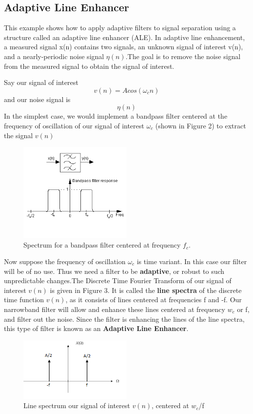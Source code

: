 \subsection{Adaptive Line Enhancer}
This example shows how to apply adaptive filters to signal separation using a structure called an adaptive line enhancer (ALE). In adaptive line enhancement, a measured signal x(n) contains two signals, an unknown signal of interest v(n), and a nearly-periodic noise signal $\eta(n)$.The goal is to remove the noise signal from the measured signal to obtain the signal of interest. 

Say our signal of interest $$v(n)= Acos(\omega_cn)$$ and our noise signal is $$\eta(n)$$In the simplest case, we would implement a bandpass filter centered at the frequency of oscillation of our signal of interest $\omega_c$ (shown in Figure 2) to extract the signal $v(n)$

\begin{figure}[!ht]
\centering
\includegraphics[width=0.5\textwidth]{bandpass_filter.png}
\caption{\label{fig:bandpass_filter}Spectrum for a bandpass filter centered at frequency $f_c$.}
\end{figure}

Now suppose the frequency of oscillation $\omega_c$ is time variant. In this case our filter will be of no use. Thus we need a filter to be \textbf{adaptive}, or robust to such unpredictable changes.The Discrete Time Fourier Transform of our signal of interest $v(n)$ is given in Figure 3. It is called the \textbf{line spectra} of the discrete time function $v(n)$, as it consists of lines centered at frequencies f and -f. Our narrowband filter will allow and enhance these lines centered at frequency $w_c$ or f, and filter out the noise. Since the filter is enhancing the lines of the line spectra, this type of filter is known as an \textbf{Adaptive Line Enhancer}.

\begin{figure}[!ht]
\centering
\includegraphics[width=0.5\textwidth]{cosinedtft.png}
\caption{\label{fig:cosinedtft}Line spectrum our signal of interest $v(n)$, centered at $w_c$/f}
\end{figure}


